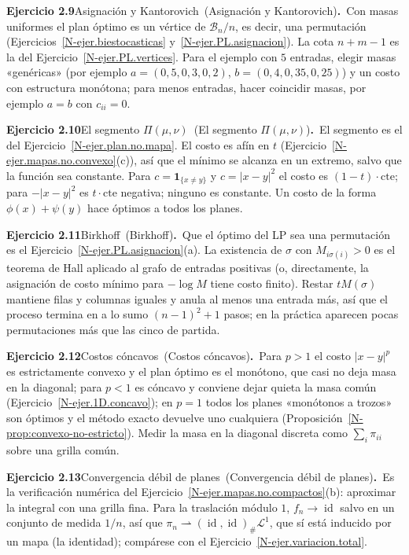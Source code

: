 \documentclass[11pt,a4paper]{amsart}
\newcommand{\id}{\operatorname{id}}
\newcommand{\B}{{\mathcal B}}
\newcommand{\LL}{{\mathcal L}}
\newcommand{\I}{{\mathbf 1}}
\theoremstyle{remark}
\theoremstyle{definition}
\numberwithin{subsection}{section}
\numberwithin{equation}{section}
\newcommand{\ejlabel}[2]{\par\medskip\noindent\textbf{Ejercicio #1}\ifx\relax#2\relax\else\ (#2)\fi\textbf{.}\ }
\begin{document}
\ejlabel{2.9}{Asignación y Kantorovich}Con masas uniformes el plan óptimo es un vértice de $\B_n/n$, es decir, una permutación (Ejercicios~\ref{N-ejer.biestocasticas} y~\ref{N-ejer.PL.asignacion}). La cota $n+m-1$ es la del Ejercicio~\ref{N-ejer.PL.vertices}. Para el ejemplo con $5$ entradas, elegir masas «genéricas» (por ejemplo $a=(0{,}5,0{,}3,0{,}2)$, $b=(0{,}4,0{,}35,0{,}25)$) y un costo con estructura monótona; para menos entradas, hacer coincidir masas, por ejemplo $a=b$ con $c_{ii}=0$.

\ejlabel{2.10}{El segmento $\Pi(\mu,\nu)$}El segmento es el del Ejercicio~\ref{N-ejer.plan.no.mapa}. El costo es afín en $t$ (Ejercicio~\ref{N-ejer.mapas.no.convexo}(c)), así que el mínimo se alcanza en un extremo, salvo que la función sea constante. Para $c=\I_{\{x\ne y\}}$ y $c=|x-y|^2$ el costo es $(1-t)\cdot\mathrm{cte}$; para $-|x-y|^2$ es $t\cdot\mathrm{cte}$ negativa; ninguno es constante. Un costo de la forma $\phi(x)+\psi(y)$ hace óptimos a todos los planes.

\ejlabel{2.11}{Birkhoff}Que el óptimo del LP sea una permutación es el Ejercicio~\ref{N-ejer.PL.asignacion}(a). La existencia de $\sigma$ con $M_{i\sigma(i)}>0$ es el teorema de Hall aplicado al grafo de entradas positivas (o, directamente, la asignación de costo mínimo para $-\log M$ tiene costo finito). Restar $tM(\sigma)$ mantiene filas y columnas iguales y anula al menos una entrada más, así que el proceso termina en a lo sumo $(n-1)^2+1$ pasos; en la práctica aparecen pocas permutaciones más que las cinco de partida.

\ejlabel{2.12}{Costos cóncavos}Para $p>1$ el costo $|x-y|^p$ es estrictamente convexo y el plan óptimo es el monótono, que casi no deja masa en la diagonal; para $p<1$ es cóncavo y conviene dejar quieta la masa común (Ejercicio~\ref{N-ejer.1D.concavo}); en $p=1$ todos los planes «monótonos a trozos» son óptimos y el método exacto devuelve uno cualquiera (Proposición~\ref{N-prop:convexo-no-estricto}). Medir la masa en la diagonal discreta como $\sum_i\pi_{ii}$ sobre una grilla común.

\ejlabel{2.13}{Convergencia débil de planes}Es la verificación numérica del Ejercicio~\ref{N-ejer.mapas.no.compactos}(b): aproximar la integral con una grilla fina. Para la traslación módulo $1$, $f_n\to\id$ salvo en un conjunto de medida $1/n$, así que $\pi_n\rightharpoonup(\id,\id)_\#\LL^1$, que sí está inducido por un mapa (la identidad); compárese con el Ejercicio~\ref{N-ejer.variacion.total}.
\end{document}
